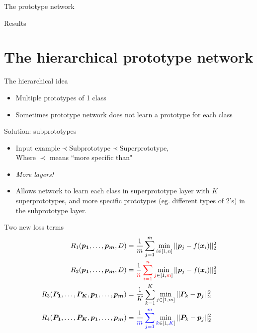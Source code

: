 \documentclass{beamer}[169]
\begin{document}
\begin{frame}{The prototype network}
\begin{figure}
    
    \end{figure}
\end{frame}

\begin{frame}{Results}
    
\end{frame}


\section{The hierarchical prototype network}
\begin{frame}{The hierarchical idea}
\begin{itemize}
    \item Multiple prototypes of 1 class 
    \item Sometimes prototype network does not learn a prototype for each class
\end{itemize}
Solution: \alert{subprototypes}\pause
\begin{itemize}
    \item $ \text{Input example}\prec \text{Subprototype}\prec \text{Superprototype}$, \\
    Where $\prec$ means ``more specific than"
    \item \emph{More layers!}
    \item Allows network to learn each class in superprototype layer with $K$ superprototypes, and more specific prototypes (eg. different types of 2's) in the subprototype layer.
\end{itemize}
\end{frame}

\begin{frame}{Two new loss terms}
 \begin{align*}
R_1(\bm{p_1}, \dots, \bm{p_m}, D) &= \frac{1}{m}\sum_{j=1}^m \min_{i\in [1,n]}||\bm{p}_j- f(\bm{x}_i)||^2_2 \\
      R_2(\bm{p_1},  \dots, \bm{p_m}, D) &= \frac{1}{{\color{red}n}}\sum_{{\color{red}i}=1}^{\color{red}n} \min_{{\color{red}j}\in [1,{\color{red}m}]}||\bm{p}_j- f(\bm{x}_i)||^2_2\\
     R_3(\bm{P_1}, \dots, \bm{P_K}, \bm{p_1}, \dots, \bm{p_m}) &= \frac{1}{K}\sum_{k=1}^K \min_{j\in [1,m]}||\bm{P}_k- \bm{p}_j||^2_2 \\
    R_4(\bm{P_1}, \dots, \bm{P_K}, \bm{p_1}, \dots, \bm{p_m}) &= \frac{1}{{\color{blue}m}}\sum_{{\color{blue}j}=1}^{\color{blue}m} \min_{{\color{blue}k}\in [1,{\color{blue}K}]}||\bm{P}_k- \bm{p}_j||^2_2
 \end{align*}
\end{frame}
\end{document}
